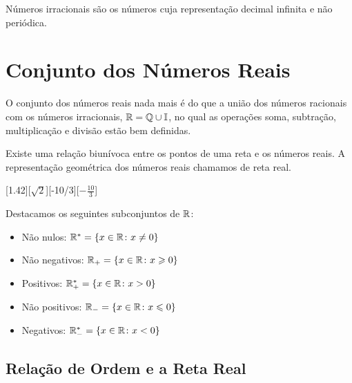 \begin{obs}
Números irracionais são os números cuja representação decimal infinita e não periódica.
\end{obs}

\section{Conjunto dos Números Reais}

O conjunto dos números reais nada mais é do que a união dos números racionais com os números irracionais, $\mathbb{R}= \mathbb{Q} \cup \mathbb{I}$, no qual as operações soma, subtração, multiplicação e divisão estão bem definidas.

Existe uma relação biunívoca entre os pontos de uma reta e os números reais. A representação geométrica dos números reais chamamos de reta real.

\begin{center}
    [1.42][$\sqrt{2}$][-10/3][$-\frac{10}{3}$]
\end{center}

Destacamos os seguintes subconjuntos de $\mathbb{R}$:
\begin{itemize}
    \item Não nulos: $\mathbb{R}^* = \{x\in \mathbb{R} \colon x\neq 0\}$
    \item Não negativos: $\mathbb{R}_{+} = \{x\in \mathbb{R} \colon x\geqslant 0\}$
    \item Positivos: $\mathbb{R}_{+}^* = \{x\in \mathbb{R} \colon x>0\}$
    \item Não positivos: $\mathbb{R}_{-} = \{x\in \mathbb{R} \colon x\leqslant 0\}$
    \item Negativos: $\mathbb{R}_{-}^* = \{x\in \mathbb{R} \colon x< 0\}$
\end{itemize}

\subsection{Relação de Ordem e a Reta Real}


